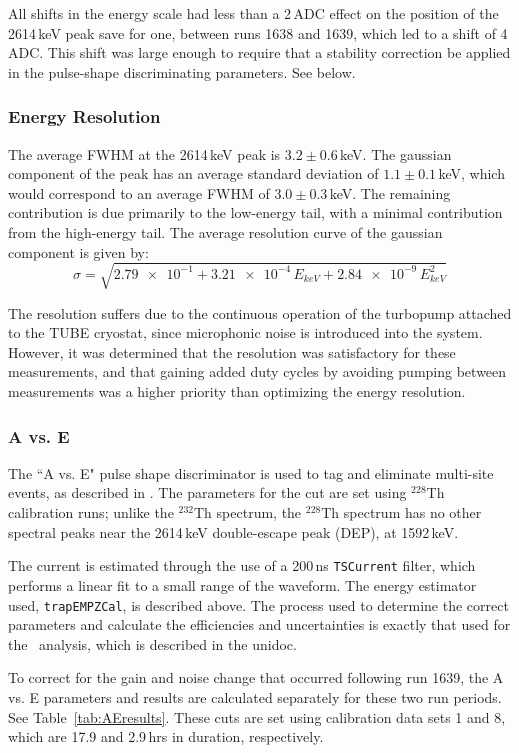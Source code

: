 All shifts in the energy scale had less than a 2\,ADC effect on the position of the 2614\,keV peak save for one, between runs 1638 and 1639, which led to a shift of 4\,ADC. This shift was large enough to require that a stability correction be applied in the pulse-shape discriminating parameters. See below. 

\subsubsection{Energy Resolution}
The average FWHM at the 2614\,keV peak is $3.2\pm0.6$\,keV. The gaussian component of the peak has an average standard deviation of $1.1\pm0.1$\,keV, which would correspond to an average FWHM of $3.0\pm0.3$\,keV. The remaining contribution is due primarily to the low-energy tail, with a minimal contribution from the high-energy tail. The average resolution curve of the gaussian component is given by:
$$\sigma = \sqrt{\num{2.79e-1}+\num{3.21e-4}\,E_{keV}+\num{2.84e-9}\,E_{keV}^2}$$

The resolution suffers due to the continuous operation of the turbopump attached to the TUBE cryostat, since microphonic noise is introduced into the system. However, it was determined that the resolution was satisfactory for these measurements, and that gaining added duty cycles by avoiding pumping between measurements was a higher priority than optimizing the energy resolution. 

\subsubsection{A vs. E}
The ``A vs. E" pulse shape discriminator is used to tag and eliminate multi-site events, as described in \cite{AvsE_unidoc}. The parameters for the cut are set using $^{228}$Th calibration runs; unlike the $^{232}$Th spectrum, the $^{228}$Th spectrum has no other spectral peaks near the 2614\,keV double-escape peak (DEP), at 1592\,keV.

The current is estimated through the use of a 200\,ns {\tt TSCurrent} filter, which performs a linear fit to a small range of the waveform. The energy estimator used, {\tt trapEMPZCal}, is described above. The process used to determine the correct parameters and calculate the efficiencies and uncertainties is exactly that used for the \MJ\ analysis, which is described in the unidoc. 

To correct for the gain and noise change that occurred following run 1639, the A vs. E parameters and results are calculated separately for these two run periods. See Table~\ref{tab:AEresults}. These cuts are set using calibration data sets 1 and 8, which are 17.9 and 2.9\,hrs in duration, respectively. 



